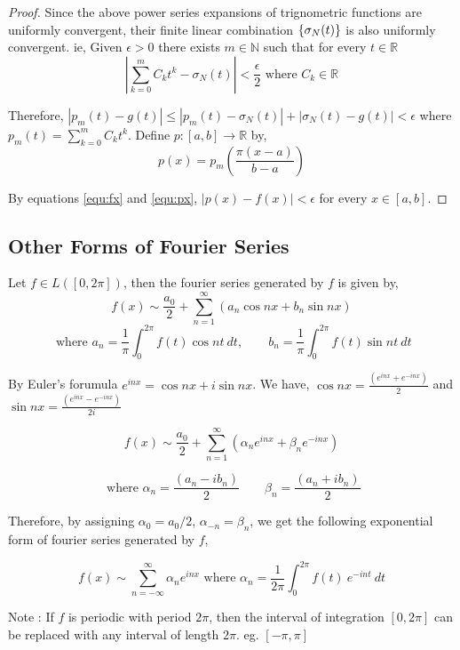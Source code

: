 \begin{proof}
Since the above power series expansions of trignometric functions are uniformly convergent, their finite linear combination \(\{\sigma_N(t)\}\) is also uniformly convergent.
ie, Given \(\epsilon > 0\) there exists \(m \in \mathbb{N}\) such that for every \(t \in \mathbb{R}\)
\[\left|\sum_{k = 0}^m C_k t^k - \sigma_N(t)\right| < \frac{\epsilon}{2} \text{ where } C_k \in \mathbb{R}\]

Therefore, \(| p_m(t) - g(t)| \le | p_m(t) - \sigma_N(t) | + |\sigma_N(t) - g(t)| < \epsilon\) where \(p_m(t) = \sum_{k = 0}^m C_k t^k\).
Define \(p : [a,b] \to \mathbb{R}\) by,
\begin{equation}
	p(x) = p_m\left( \frac{\pi(x-a)}{b-a} \right)
	\label{equ:px}
\end{equation}

By equations \ref{equ:fx} and \ref{equ:px}, \(|p(x)-f(x)| < \epsilon\) for every \(x \in [a,b]\).
\end{proof}

\subsection{Other Forms of Fourier Series}

Let \(f \in L([0,2\pi])\), then the fourier series generated by $f$ is given by,
\[ f(x) \sim \frac{a_0}{2}+\sum_{n=1}^\infty \left( a_n \cos nx + b_n \sin nx \right) \]
\[ \text{ where } a_n = \frac{1}{\pi} \int_0^{2\pi} f(t) \cos nt\ dt,\qquad b_n = \frac{1}{\pi} \int_0^{2\pi} f(t) \sin nt\ dt \]

By Euler's forumula \(e^{inx} = \cos nx + i\sin nx\).
We have, \(\cos nx = \frac{(e^{inx}+e^{-inx})}{2}\) and \(\sin nx = \frac{(e^{inx}-e^{-inx})}{2i}\)

\[ f(x) \sim \frac{a_0}{2} + \sum_{n=1}^\infty \left( \alpha_n e^{inx} + \beta_n e^{-inx} \right) \]

\[ \text{ where } \alpha_n = \frac{(a_n - ib_n)}{2} \qquad \beta_n = \frac{(a_n+ib_n)}{2} \]

Therefore, by assigning \(\alpha_0 = a_0/2\), \(\alpha_{-n} = \beta_n\), we get the following exponential form of fourier series generated by $f$,

\[ f(x) \sim \sum_{n = -\infty}^\infty \alpha_n e^{inx} \text{ where } \alpha_n = \frac{1}{2\pi} \int_0^{2\pi} f(t)\ e^{-int}\ dt \]

Note : If $f$ is periodic with period $2\pi$, then the interval of integration $[0,2\pi]$ can be replaced with any interval of length $2\pi$.
eg. $[-\pi,\pi]$

